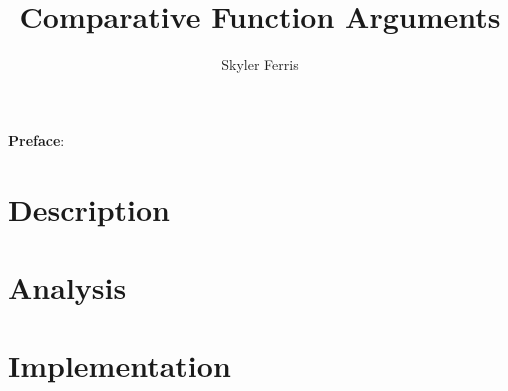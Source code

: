 \documentclass[twocolumn]{article}
\begin{document}
\textbf{Preface}:
\textit{}
\newpage

\title{Comparative Function Arguments}
\author{Skyler Ferris}
\date{}
\maketitle


\newpage
\part{Description}

\newpage

\newpage

\newpage
\part{Analysis}
\newpage
\part{Implementation}
\newpage

\printbibliography
\end{document}
